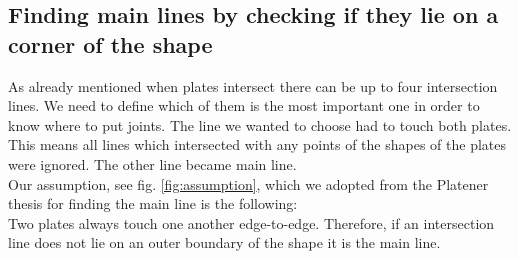 \documentclass[../ClassicThesis.tex]{subfiles}
\begin{document}
\subsection{Finding main lines by checking if they lie on a corner of the shape}
As already mentioned when plates intersect there can be up to four intersection lines. We need to define which of them is the most important one in order to know where to put joints. The line we wanted to choose had to touch both plates.\\
This means all lines which intersected with any points of the shapes of the plates were ignored. The other line became main line.\\
Our assumption, see fig. \ref{fig:assumption}, which we adopted from the Platener thesis \cite{master-thesis} for finding the main line is the following:\\
Two plates always touch one another edge-to-edge. Therefore, if an intersection line does not lie on an outer boundary of the shape it is the main line.
\end{document}
